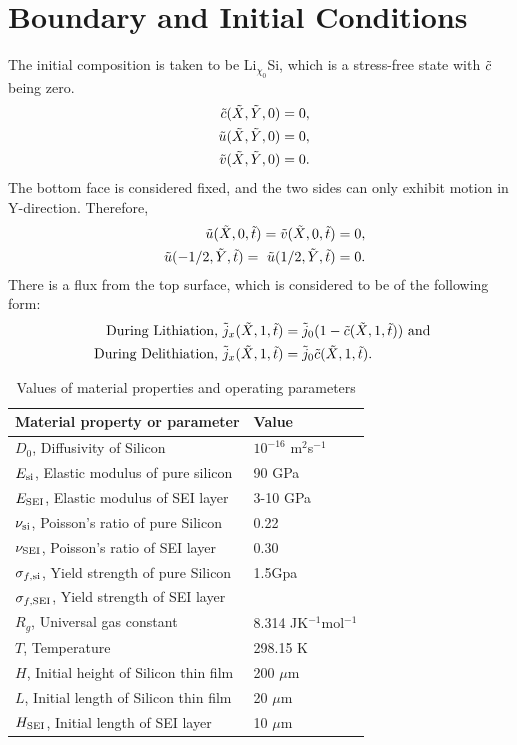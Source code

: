 \section{Boundary and Initial Conditions}
The initial composition is taken to be Li$_{\chi_{0}}$Si, which is a stress-free state with $\tilde{c}$ being zero.
\begin{align}
    \tc(\tX, \tY, 0) = 0, \\
    \tu(\tX, \tY, 0) = 0,\\
    \tv(\tX, \tY, 0) = 0.
\end{align}
The bottom face is considered fixed, and the two sides can only exhibit motion in Y-direction. Therefore,
\begin{align}
    \tu(\tX, 0, \tt) = \tv(\tX, 0, \tt) = 0, \\
    \tu(-1/2, \tY, \tt) =  \tu(1/2, \tY, \tt) = 0.
\end{align}
There is a flux from the top surface, which is considered to be of the following form: 
\begin{align}
    \text{During Lithiation, }\td{j}_x(\tX, 1, \tt) &= \td{j}_0 (1 - \tc(\tX, 1, \tt)) \text{ and } \\
    \text{During Delithiation, }\td{j}_x(\tX, 1, \tt) &= \td{j}_0 \tc(\tX, 1, \tt).
\end{align} 

\begin{table}[H]
\caption{Values of material properties and operating parameters}
\vspace{1em}
\begin{tabularx}{\textwidth}{Xl}
\hline
 {Material property or parameter} & {Value} \\
\hline
$D_0$, Diffusivity of Silicon & $10^{-16}$ m$^{2}$s$^{-1}$ \\
$E_{{\rm{si}}}$, Elastic modulus of pure silicon & 90 GPa \\
$E_{\rm{SEI}}$, Elastic modulus of SEI layer & 3-10 GPa \\
$\nu_{{\rm{si}}}$, Poisson's ratio of pure Silicon & 0.22\\
$\nu_{\rm{SEI}}$, Poisson's ratio of SEI layer & 0.30\\
$\sigma_{f,{\rm{si}}}$, Yield strength of pure Silicon & 1.5Gpa\\
$\sigma_{f, {\rm{SEI}}}$, Yield strength of SEI layer & \\
$R_g$, Universal gas constant & 8.314 JK$^{-1}$mol$^{-1}$\\
$T$, Temperature & 298.15 K\\
$H$, Initial height of Silicon thin film & 200 $\mu$m\\
$L$, Initial length of Silicon thin film & 20 $\mu$m\\
$H_{\rm{SEI}}$, Initial length of SEI layer & 10 $\mu$m
\end{tabularx}
\end{table}
